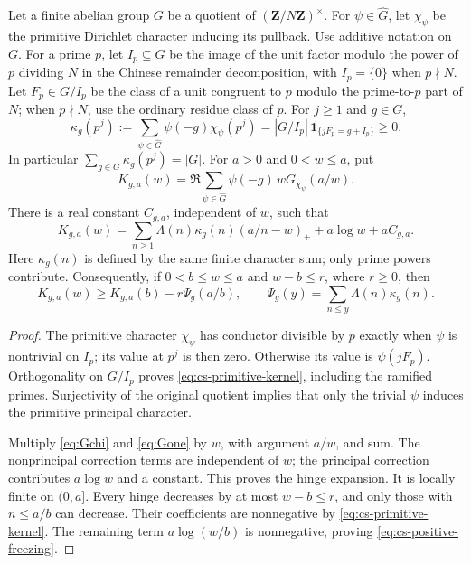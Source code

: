 \begin{lemma}
\label{cs-primitive-positive-kernel}
Let a finite abelian group $G$ be a quotient of
$(\mathbf Z/N\mathbf Z)^\times$. For $\psi\in\widehat G$, let
$\chi_\psi$ be the primitive Dirichlet character inducing its pullback.
Use additive notation on $G$. For a prime $p$, let $I_p\subseteq G$
be the image of the unit factor modulo the power of $p$ dividing $N$ in the Chinese remainder
decomposition, with $I_p=\{0\}$ when $p\nmid N$. Let $F_p\in G/I_p$
be the class of a unit congruent to $p$ modulo the prime-to-$p$ part
of $N$; when $p\nmid N$, use the ordinary residue class of $p$.
For $j\ge1$ and $g\in G$,
\begin{equation}\label{eq:cs-primitive-kernel}
 \kappa_g(p^j):=\sum_{\psi\in\widehat G}\psi(-g)\chi_\psi(p^j)
       =|G/I_p|\,\mathbf1_{\{jF_p=g+I_p\}}\ge0.
\end{equation}
In particular $\sum_{g\in G}\kappa_g(p^j)=|G|$.
For $a>0$ and $0<w\le a$, put
\[
 K_{g,a}(w)=\Re\sum_{\psi\in\widehat G}
                    \psi(-g)\,wG_{\chi_\psi}(a/w).
\]
There is a real constant $C_{g,a}$, independent of $w$, such that
\[
 K_{g,a}(w)=
  \sum_{n\ge1}\Lambda(n)\kappa_g(n)(a/n-w)_+
                         +a\log w+aC_{g,a}.
\]
Here $\kappa_g(n)$ is defined by the same finite character sum;
only prime powers contribute. Consequently, if $0<b\le w\le a$
and $w-b\le r$, where $r\ge0$, then
\begin{equation}\label{eq:cs-positive-freezing}
 K_{g,a}(w)\ge K_{g,a}(b)-r\Psi_g(a/b),\qquad
 \Psi_g(y)=\sum_{n\le y}\Lambda(n)\kappa_g(n).
\end{equation}
\end{lemma}
\begin{proof}
The primitive character $\chi_\psi$ has conductor divisible by $p$
exactly when $\psi$ is nontrivial on $I_p$; its value at $p^j$ is then
zero. Otherwise its value is $\psi(jF_p)$. Orthogonality on $G/I_p$
proves \eqref{eq:cs-primitive-kernel}, including the ramified primes.
Surjectivity of the original quotient implies that only the trivial
$\psi$ induces the primitive principal character.

Multiply \eqref{eq:Gchi} and \eqref{eq:Gone} by $w$, with argument
$a/w$, and sum. The nonprincipal correction terms are independent
of $w$; the principal correction contributes $a\log w$ and a constant.
This proves the hinge expansion. It is locally finite on $(0,a]$.
Every hinge decreases by at most $w-b\le r$, and only those with
$n\le a/b$ can decrease. Their coefficients are nonnegative by
\eqref{eq:cs-primitive-kernel}. The remaining term
$a\log(w/b)$ is nonnegative, proving \eqref{eq:cs-positive-freezing}.
\end{proof}

